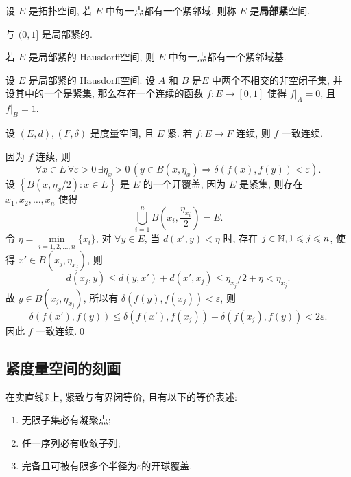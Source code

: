 	\begin{Definition}[局部紧]\label{def:局部紧}
		 设 $ E $ 是拓扑空间, 若 $ E $ 中每一点都有一个紧邻域, 则称 $ E $ 是\textbf{局部紧}空间.
	\end{Definition}

	\begin{Example}
		\R 与 $ (0, 1] $ 是局部紧的.
	\end{Example}

	\begin{Remark}
		若 $ E $ 是局部紧的 Hausdorff空间, 则 $ E $ 中每一点都有一个紧邻域基.
	\end{Remark}

	\begin{Theorem}[Urysohn引理]
		 设 $ E $ 是局部紧的 Hausdorff空间. 设 $ A $ 和 $ B $ 是$ E $ 中两个不相交的非空闭子集, 并设其中的一个是紧集, 那么存在一个连续的函数 $ f:E\to[0,1] $ 使得 $ f|_{A}=0 $, 且 $ f|_{B}=1 $.
	\end{Theorem}

	\begin{Theorem}
		 设 $ (E, d), (F, \delta) $ 是度量空间, 且 $ E $ 紧. 若 $ f:E\to F $ 连续, 则 $ f $ 一致连续.
	\end{Theorem}

	\begin{Proof}
		因为 $ f $ 连续, 则
		\[
			\forall x\in E\,\forall \varepsilon>0\,\exists\eta_{x}>0\,(y\in B(x, \eta_{x})\Rightarrow \delta(f(x), f(y))<\varepsilon).
		\]
		设 $\left\{ B(x, \eta_{x}/2) : x\in E \right\}$ 是 $ E $ 的一个开覆盖, 因为 $ E $ 是紧集, 则存在 $ x_{1}, x_{2},\dots,x_{n} $ 使得
		\[
			\bigcup_{i=1}^{n} B\left(x_{i}, \frac{\eta_{x_{i}}}{2}\right)=E.
		\]
		令 $ \eta=\min\limits_{i=1, 2, \dots, n}\{ x_{i} \} $, 对 $ \forall y\in E $, 当 $ d(x', y)<\eta $ 时, 存在 $ j\in\mathbb{N}, 1\leqslant j\leqslant n $, 使得 $ x'\in B(x_{j}, \eta_{x_{j}}) $, 则
		\[
			d(x_{j}, y) \leqslant d(y, x')+d(x', x_{j})\leqslant\eta_{x_{j}}/2+\eta<\eta_{x_{j}}.
		\]
		故 $ y\in B(x_{j}, \eta_{x_{j}}) $, 所以有 $ \delta(f(y), f(x_{j}))<\varepsilon $, 则
		\[
			\delta(f(x'), f(y))\leqslant \delta(f(x'), f(x_{j}))+\delta(f(x_{j}), f(y))<2\varepsilon.
		\]
		因此 $ f $ 一致连续.\qed
	\end{Proof}

	\subsection{紧度量空间的刻画}

	\begin{Example}
		在实直线$ \mathbb{R} $上, 紧致与有界闭等价, 且有以下的等价表述:
		\begin{enumerate}[(1)]
			\item 无限子集必有凝聚点;
			\item 任一序列必有收敛子列;
			\item 完备且可被有限多个半径为$ \varepsilon $的开球覆盖.
		\end{enumerate}
	\end{Example}

